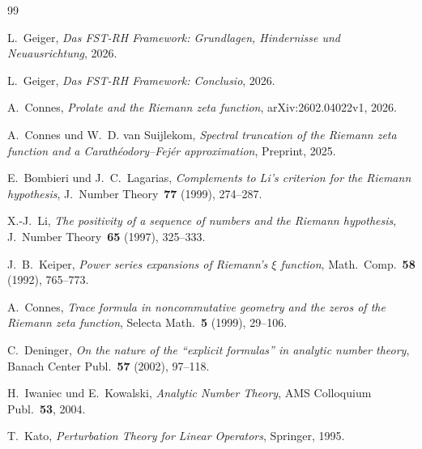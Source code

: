 \documentclass[12pt,a4paper]{article}
\theoremstyle{definition}
\theoremstyle{remark}
\begin{document}
\begin{thebibliography}{99}

L.~Geiger, \emph{Das FST-RH Framework: Grundlagen, Hindernisse und Neuausrichtung}, 2026.

L.~Geiger, \emph{Das FST-RH Framework: Conclusio}, 2026.

A.~Connes, \emph{Prolate and the Riemann zeta function}, arXiv:2602.04022v1, 2026.

A.~Connes und W.~D. van Suijlekom, \emph{Spectral truncation of the Riemann zeta function and a Carath\'eodory--Fej\'er approximation}, Preprint, 2025.

E.~Bombieri und J.~C.~Lagarias, \emph{Complements to Li's criterion for the Riemann hypothesis}, J.~Number Theory~\textbf{77} (1999), 274--287.

X.-J.~Li, \emph{The positivity of a sequence of numbers and the Riemann hypothesis}, J.~Number Theory~\textbf{65} (1997), 325--333.

J.~B.~Keiper, \emph{Power series expansions of Riemann's $\xi$ function}, Math.~Comp.~\textbf{58} (1992), 765--773.

A.~Connes, \emph{Trace formula in noncommutative geometry and the zeros of the Riemann zeta function}, Selecta Math.~\textbf{5} (1999), 29--106.

C.~Deninger, \emph{On the nature of the ``explicit formulas'' in analytic number theory}, Banach Center Publ.~\textbf{57} (2002), 97--118.

H.~Iwaniec und E.~Kowalski, \emph{Analytic Number Theory}, AMS Colloquium Publ.~\textbf{53}, 2004.

T.~Kato, \emph{Perturbation Theory for Linear Operators}, Springer, 1995.

\end{thebibliography}
\end{document}

